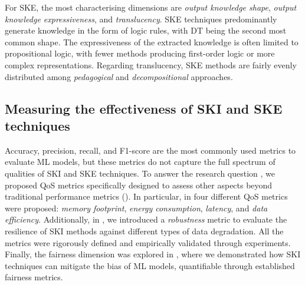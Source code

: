 For \gls{SKE}, the most characterising dimensions are \emph{output knowledge shape}, \emph{output knowledge expressiveness}, and \emph{translucency}.
%
\gls{SKE} techniques predominantly generate knowledge in the form of logic rules, with \gls{DT} being the second most common shape.
%
The expressiveness of the extracted knowledge is often limited to propositional logic, with fewer methods producing first-order logic or more complex representations.
%
Regarding translucency, \gls{SKE} methods are fairly evenly distributed among \emph{pedagogical} and \emph{decompositional} approaches.


\subsection*{Measuring the effectiveness of \gls{SKI} and \gls{SKE} techniques}
%
Accuracy, precision, recall, and F1-score are the most commonly used metrics to evaluate \gls{ML} models, but these metrics do not capture the full spectrum of qualities of \gls{SKI} and \gls{SKE} techniques.
%
To answer the research question , we proposed \gls{QoS} metrics specifically designed to assess other aspects beyond traditional performance metrics ().
%
In particular, in  four different \gls{QoS} metrics were proposed: \emph{memory footprint}, \emph{energy consumption}, \emph{latency}, and \emph{data efficiency}.
%
Additionally, in , we introduced a \emph{robustness} metric to evaluate the resilience of \gls{SKI} methods against different types of data degradation.
%
All the metrics were rigorously defined and empirically validated through experiments.
%
Finally, the fairness dimension was explored in , where we demonstrated how \gls{SKI} techniques can mitigate the bias of \gls{ML} models, quantifiable through established fairness metrics.


